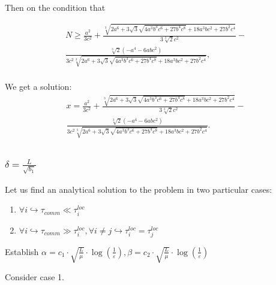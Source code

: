 \documentclass{article}
\begin{document}
Then on the condition that 

\begin{gather*}
    N \geq \frac{a^2}{3 c^2}+\frac{\sqrt[3]{2 a^6+3 \sqrt{3} \sqrt{4 a^3 b^3 c^6+27 b^4 c^8}+18 a^3 b c^2+27 b^2 c^4}}{3 \sqrt[3]{2} c^2}-  \\
    \frac{\sqrt[3]{2}\left(-a^4-6 a b c^2\right) } 
    {3 c^2 \sqrt[3]{2 a^6+3 \sqrt{3} \sqrt{4 a^3 b^3 c^6+27 b^4 c^8}+18 a^3 b c^2+27 b^2 c^4}}, \\
\end{gather*}

We get a solution: \\

\begin{gather*}
     x=\frac{a^2}{3 c^2}+\frac{\sqrt[3]{2 a^6+3 \sqrt{3} \sqrt{4 a^3 b^3 c^6+27 b^4 c^8}+18 a^3 b c^2+27 b^2 c^4}}{3 \sqrt[3]{2} c^2}- \\ \frac{\sqrt[3]{2}\left(-a^4-6 a b c^2\right)} 
    {3 c^2 \sqrt[3]{2 a^6+3 \sqrt{3} \sqrt{4 a^3 b^3 c^6+27 b^4 c^8}+18 a^3 b c^2+27 b^2 c^4}}.  \\
\end{gather*}

\subsubsection{$\delta = \frac{L}{\sqrt{b_1}}$}\label{eq:3.4.2}
Let us find an analytical solution to the problem in two particular cases:
\begin{enumerate}
    \item $\forall i\hookrightarrow \tau_{comm} \ll \tau_i^{loc}$
    \item $\forall i\hookrightarrow \tau_{comm} \gg \tau_i^{loc}, \forall i\neq j\hookrightarrow \tau_i^{loc} = \tau_j^{loc}$
\end{enumerate}

Establish $\alpha = c_1\cdot\sqrt{\frac{L}{\mu}}\cdot \log(\frac{1}{\varepsilon}),\beta = c_2\cdot\sqrt{\frac{L}{\mu}}\cdot \log(\frac{1}{\varepsilon}) $

Consider case 1.
\end{document}
